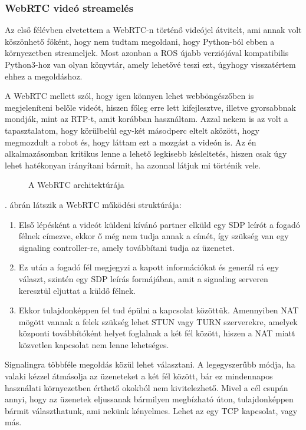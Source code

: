 \documentclass[11pt,a4paper,oneside]{article}
\newcommand{\Afigref}[1]{\Aref{fig:#1}.}
\newcommand{\insertfig}[4]{
	\vspace*{2mm}
	\begin{figure}[#4]
		\center
		\resizebox{#3}{!}{\texttt{[image: images/\#1]}}
		\parbox{0.8\textwidth}{\vspace*{4mm}\caption{{#2}}\small\label{fig:#1}}
	\end{figure}
	\vspace*{-2\parskip}
}
\begin{document}
\subsubsection{WebRTC videó streamelés}

Az első félévben elvetettem a WebRTC-n történő videójel átvitelt, ami annak volt köszönhető főként, hogy nem tudtam megoldani, hogy Python-ból ebben a környezetben streameljek. Most azonban a ROS újabb verziójával kompatibilis Python3-hoz van olyan könyvtár, amely lehetővé teszi ezt, úgyhogy visszatértem ehhez a megoldáshoz.

A WebRTC mellett szól, hogy igen könnyen lehet webböngészőben is megjeleníteni belőle videót, hiszen főleg erre lett kifejlesztve, illetve gyorsabbnak mondják, mint az RTP-t, amit korábban használtam. Azzal nekem is az volt a tapasztalatom, hogy körülbelül egy-két másodperc eltelt aközött, hogy megmozdult a robot és, hogy láttam ezt a mozgást a videón is. Az én alkalmazásomban kritikus lenne a lehető legkisebb késleltetés, hiszen csak úgy lehet hatékonyan irányítani bármit, ha azonnal látjuk mi történik vele.

\insertfig{webrtc-architecture}{A WebRTC architektúrája}{12cm}{h!}

\Afigref{webrtc-architecture} ábrán látszik a WebRTC működési struktúrája:
\begin{enumerate}
  \item Első lépésként a videót küldeni kívánó partner elküld egy SDP leírót a fogadó félnek címezve, ekkor ő még nem tudja annak a címét, így szükség van egy signaling controller-re, amely továbbítani tudja az üzenetet.
  \item Ez után a fogadó fél megjegyzi a kapott információkat és generál rá egy választ, szintén egy SDP leírás formájában, amit a signaling serveren keresztül eljuttat a küldő félnek.
  \item Ekkor tulajdonképpen fel tud épülni a kapcsolat közöttük. Amennyiben NAT mögött vannak a felek szükség lehet STUN vagy TURN szerverekre, amelyek központi továbbítóként helyet foglalnak a két fél között, hiszen a NAT miatt közvetlen kapcsolat nem lenne lehetséges.
\end{enumerate}

Signalingra többféle megoldás közül lehet választani. A legegyszerűbb módja, ha valaki kézzel átmásolja az üzeneteket a két fél között, bár ez mindennapos használati környezetben érthető okokból nem kivitelezhető. Mivel a cél csupán annyi, hogy az üzenetek eljussanak bármilyen megbízható úton, tulajdonképpen bármit választhatunk, ami nekünk kényelmes. Lehet az egy TCP kapcsolat, vagy más.
\end{document}
